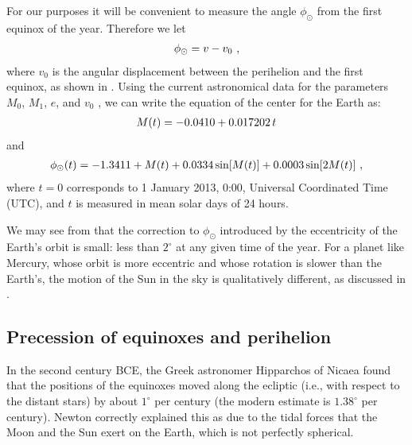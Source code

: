For our purposes it will be convenient to measure the angle $\phi_\odot$ from the first equinox of the year.  Therefore we let
\begin{eqnarray}
\phi_\odot = v - v_0 ~,
\la{eq:v0}
\end{eqnarray}
where $v_0$ is the angular displacement between the perihelion and the first equinox, as shown in .  Using the current astronomical data for the parameters $M_0$, $M_1$, $e$, and $v_0$ \cite{orbit-parameters}, we can write the equation of the center for the Earth as:
\begin{eqnarray}
M(t) = -0.0410 + 0.017202 \, t
\la{eq:mean-numbers}
\end{eqnarray}
and
\begin{eqnarray}
\phi_\odot (t) = - 1.3411 + M(t) + 0.0334 \sin [M(t)] + 0.0003 \sin [2M(t)]~,
\la{eq:center-numbers} 
\end{eqnarray}
where $t = 0$ corresponds to 1 January 2013, 0:00, Universal Coordinated Time (UTC), and $t$ is measured in mean solar days of 24 hours.

We may see from  that the correction to $\phi_\odot$ introduced by the eccentricity of the Earth's orbit is small: less than $2^\circ$ at any given time of the year.  For a planet like Mercury, whose orbit is more eccentric and whose rotation is slower than the Earth's, the motion of the Sun in the sky is qualitatively different, as discussed in \citep{Mercury}.

\subsection{Precession of equinoxes and perihelion}

In the second century BCE, the Greek astronomer Hipparchos of Nicaea found that the positions of the equinoxes moved along the ecliptic (i.e., with respect to the distant stars) by about $1^\circ$ per century (the modern estimate is $1.38^\circ$ per century).  Newton correctly explained this as due to the tidal forces that the Moon and the Sun exert on the Earth, which is not perfectly spherical.  


